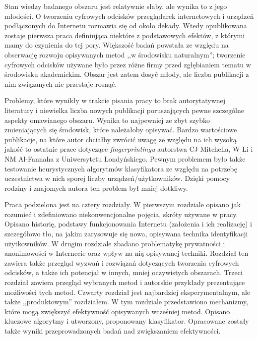 Stan wiedzy badanego obszaru jest relatywnie słaby, ale wynika to z jego
młodości. O tworzeniu cyfrowych odcisków przeglądarek internetowych i urządzeń
podłączonych do Internetu rozmawia się od około dekady. Wtedy opublikowana
zostaje pierwsza praca definiująca niektóre z podstawowych efektów, z którymi
mamy do czynienia do tej pory. Większość badań powstała ze względu na obserwację
rozwoju opisywanych metod ,,w środowisku naturalnym''; tworzenie cyfrowych
odcisków używane było przez różne firmy przed zgłębianiem tematu w środowisku
akademickim. Obszar jest zatem dosyć młody, ale liczba publikacji z nim
związanych nie przestaje rosnąć.

Problemy, które wynikły w trakcie pisania pracy to brak autorytatywnej
literatury i niewielka liczba nowych publikacji poruszających pewne szczególne
aspekty omawianego obszaru. Wynika to najpewniej ze zbyt szybko zmieniających
się środowisk, które należałoby opisywać. Bardzo wartościowe publikacje, na
które autor chciałby zwrócić uwagę ze względu na ich wysoką jakość to ostatnie
prace dotyczące \emph{fingerprintingu} autorstwa CJ Mitchella, W Li i NM
Al-Fannaha z Uniwersytetu Londyńskiego. Pewnym problemem było także testowanie
heurystycznych algorytmów klasyfikatora ze względu na potrzebę uczestnictwa w
nich sporej liczby urządzeń/użytkowników. Dzięki pomocy rodziny i znajomych
autora ten problem był mniej dotkliwy.

Praca podzielona jest na cztery rozdziały. W pierwszym rozdziale opisano jak
rozumieć i zdefiniowano niekonwencjonalne pojęcia, skróty używane w pracy.
Opisano historię, podstawy funkcjonowania Internetu (założenia i ich realizację)
i szczegółowo tło, na jakim zarysowuje się nowa, opisywana technika
identyfikacji użytkowników. W drugim rozdziale zbadano problematykę prywatności
i anonimowości w Internecie oraz wpływ na nią opisywanej techniki. Rozdział ten
zawiera także przegląd wyzwań i rozwiązań dotyczących tworzenia cyfrowych
odcisków, a także ich potencjał w innych, mniej oczywistych obszarach. Trzeci
rozdział zawiera przegląd wybranych metod i autorskie przykłady prezentujące
możliwości tych metod. Czwarty rozdział jest najbardziej eksperymentalnym, ale
także ,,produktowym'' rozdziałem. W tym rozdziale przedstawiono mechanizmy,
które mogą zwiększyć efektywność opisywanych wcześniej metod. Opisano kluczowe
algorytmy i utworzony, proponowany klasyfikator. Opracowane zostały także wyniki
przeprowadzonych badań nad zwiększaniem efektywności.
